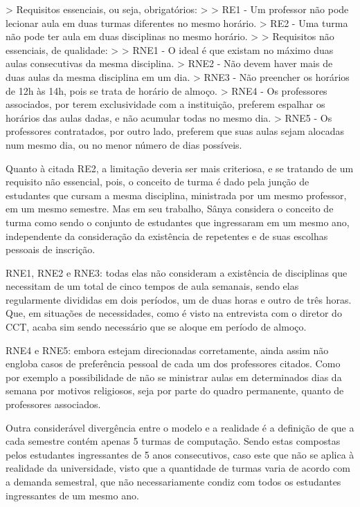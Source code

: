             > Requisitos essenciais, ou seja, obrigatórios:
            >
            > RE1 - Um professor não pode lecionar aula em duas turmas diferentes no mesmo horário.
            > RE2 - Uma turma não pode ter aula em duas disciplinas no mesmo horário.
            >
            > Requisitos não essenciais, de qualidade:
            >
            > RNE1 - O ideal é que existam no máximo duas aulas consecutivas da mesma disciplina.
            > RNE2 - Não devem haver mais de duas aulas da mesma disciplina em um dia.
            > RNE3 - Não preencher os horários de 12h às 14h, pois se trata de horário de almoço.
            > RNE4 - Os professores associados, por terem exclusividade com a instituição, preferem espalhar os horários das aulas dadas, e não acumular todas no mesmo dia.
            > RNE5 - Os professores contratados, por outro lado, preferem que suas aulas sejam alocadas num mesmo dia, ou no menor número de dias possíveis.

            Quanto à citada RE2, a limitação deveria ser mais criteriosa, e se tratando de um requisito não essencial, pois, o conceito de turma é dado pela junção de estudantes que cursam a mesma disciplina, ministrada por um mesmo professor, em um mesmo semestre. Mas em seu trabalho, Sânya considera o conceito de turma como sendo o conjunto de estudantes que ingressaram em um mesmo ano, independente da consideração da existência de repetentes e de suas escolhas pessoais de inscrição.

            RNE1, RNE2 e RNE3: todas elas não consideram a existência de disciplinas que necessitam de um total de cinco tempos de aula semanais, sendo elas regularmente divididas em dois períodos, um de duas horas e outro de três horas. Que, em situações de necessidades, como é visto na entrevista com o diretor do CCT, acaba sim sendo necessário que se aloque em período de almoço.

            RNE4 e RNE5: embora estejam direcionadas corretamente, ainda assim não engloba casos de preferência pessoal de cada um dos professores citados. Como por exemplo a possibilidade de não se ministrar aulas em determinados dias da semana por motivos religiosos, seja por parte do quadro permanente, quanto de professores associados.

            Outra considerável divergência entre o modelo e a realidade é a definição de que a cada semestre contém apenas 5 turmas de computação. Sendo estas compostas pelos estudantes ingressantes de 5 anos consecutivos, caso este que não se aplica à realidade da universidade, visto que a quantidade de turmas varia de acordo com a demanda semestral, que não necessariamente condiz com todos os estudantes ingressantes de um mesmo ano.

